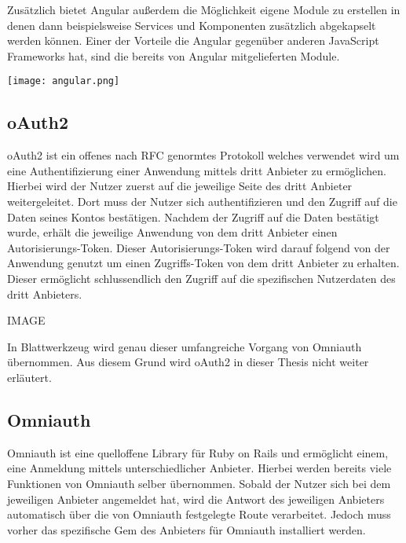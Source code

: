 \documentclass[11pt]{article}
\newcommand{\hlnote}[2]{#1}
\newcommand{\hlnote}[2]{\todo{#2}\texthl{#1}}
\begin{document}
\begin{flushleft}
			Zusätzlich bietet Angular außerdem die Möglichkeit eigene Module zu erstellen in denen dann beispielsweise Services und Komponenten zusätzlich abgekapselt werden können. \hlnote{Einer der Vorteile}{Weasel} die Angular gegenüber anderen JavaScript Frameworks hat, sind die bereits von Angular \hlnote{mitgelieferten Module}{Welche?}.

			\begin{center}
				\texttt{[image: angular.png]}
			\end{center}

			\subsection{oAuth2}
			\label{sec: oauth}
			oAuth2 ist ein offenes \hlnote{nach RFC genormtes}{Warum ist RFC wichtig?} Protokoll welches verwendet wird um eine Authentifizierung einer Anwendung mittels \hlnote{dritt Anbieter}{Typo} zu ermöglichen. Hierbei wird der Nutzer zuerst auf die jeweilige Seite des \hlnote{dritt Anbieter}{Typo} weitergeleitet. Dort muss der Nutzer sich authentifizieren und den Zugriff auf die Daten seines Kontos bestätigen. Nachdem der Zugriff auf die Daten bestätigt wurde, erhält die jeweilige Anwendung von dem dritt Anbieter einen Autorisierungs-Token. Dieser Autorisierungs-Token wird darauf folgend von der Anwendung genutzt um einen Zugriffs-Token von dem dritt Anbieter zu erhalten. Dieser ermöglicht schlussendlich den Zugriff auf die spezifischen Nutzerdaten des dritt Anbieters.\par\bigskip

			IMAGE\par\bigskip

			In Blattwerkzeug wird genau dieser umfangreiche Vorgang von Omniauth übernommen. Aus diesem Grund wird oAuth2 in dieser Thesis nicht weiter erläutert.

			\subsection{Omniauth}
			\label{sec: omniauth}
			Omniauth ist eine quelloffene Library für Ruby on Rails und ermöglicht einem, eine Anmeldung mittels unterschiedlicher Anbieter. \hlnote{Hierbei}{Wobei?} werden bereits viele Funktionen von Omniauth selber übernommen. Sobald der Nutzer sich bei dem jeweiligen Anbieter angemeldet hat, wird die Antwort des jeweiligen Anbieters automatisch über die von Omniauth festgelegte Route verarbeitet. Jedoch muss vorher das spezifische Gem des Anbieters für Omniauth installiert werden.\par\bigskip


\end{flushleft}
\end{document}
